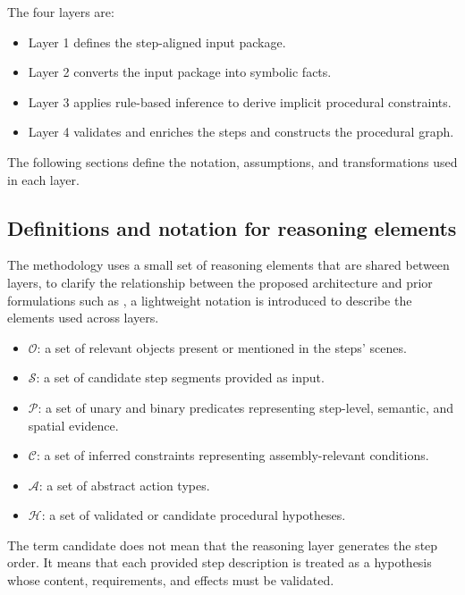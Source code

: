 The four layers are:

\begin{itemize}
    \item Layer 1 defines the step-aligned input package.
    \item Layer 2 converts the input package into symbolic facts.
    \item Layer 3 applies rule-based inference to derive implicit procedural constraints.
    \item Layer 4 validates and enriches the steps and constructs the procedural graph.
\end{itemize}

The following sections define the notation, assumptions, and transformations used in each layer.


\subsection{Definitions and notation for reasoning elements}
\label{subsec:method-definition-notation-reasoning}

The methodology uses a small set of reasoning elements that are shared between layers, to clarify the relationship between the proposed architecture and prior formulations such as \citet{Zhao2025VideoToBT}, a lightweight notation is introduced to describe the elements used across layers.

\begin{itemize}
 \item $\mathcal{O}$: a set of relevant objects present or mentioned in the steps' scenes.
 \item $\mathcal{S}$: a set of candidate step segments provided as input.
 \item $\mathcal{P}$: a set of unary and binary predicates representing step-level, semantic, and spatial evidence.
 \item $\mathcal{C}$: a set of inferred constraints representing assembly-relevant conditions.
 \item $\mathcal{A}$: a set of abstract action types.
 \item $\mathcal{H}$: a set of validated or candidate procedural hypotheses.
\end{itemize}


The term candidate does not mean that the reasoning layer generates the step order. It means that each provided step description is treated as a hypothesis whose content, requirements, and effects must be validated.

